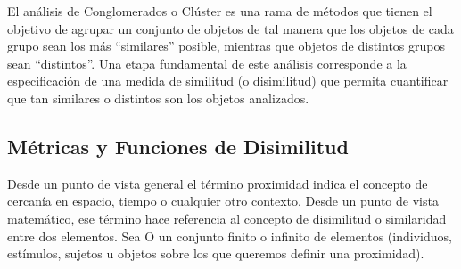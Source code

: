 \documentclass[12pt,oneside]{book}\usepackage[]{graphicx}\usepackage[]{color}
\theoremstyle{definition} %
\begin{document}

El análisis de Conglomerados o Clúster es una rama de métodos que tienen el objetivo de agrupar un conjunto de objetos de tal manera que los objetos de cada grupo sean los más ``similares'' posible, mientras que objetos de distintos grupos sean ``distintos''. Una etapa fundamental de este análisis corresponde a la especificación de una medida de similitud (o disimilitud) que permita cuantificar que tan similares o distintos son los objetos analizados.



\subsection{Métricas y Funciones de Disimilitud}

Desde un punto de vista general el término proximidad indica el concepto de cercanía en espacio, tiempo o cualquier otro contexto. Desde un punto de vista matemático, ese término hace referencia al concepto de disimilitud o similaridad entre dos elementos. 
Sea O un conjunto finito o infinito de elementos (individuos, estímulos, sujetos u objetos sobre los que queremos definir una proximidad).
\end{document}
